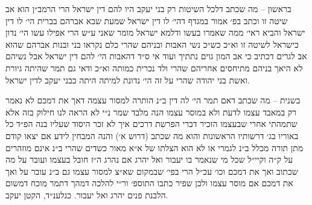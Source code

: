 \documentclass[12pt, openany]{book}
\begin{document}
\begin{multicols}{2}
בראשון – מה שכתב דלכל השיטות רק בני יעקב היו להם דין ישראל הרי הרמב״ן הוא אב שיטה זו וכתב בפ׳ אמור במגדף דהי׳ לו דין ישראל שמעת שבא אברהם בברית הי׳ לו דין ישראל והביא ראי׳ ממה שאמרו בעשו ודלמא ישראל מומר שאני ע״ש הרי אפילו עשו הי׳ נדון כישראל לשיטה זו וא״כ כש״כ נשי האבות ובניהם שהרי כלם נקראו בני ובנות אברהם שהוא אב לגרים דכתיב כי אב המון גוים נתתיך ועוד אי ס״ד דהאבות הי׳ להם דין ישראל אבל נשיהם לא היאך בניהם מתיחסים אחריהם שהרי ולד נכרית כמותה וא״כ ודאי גם תמר שהיתה גיורת ואשת בני יהודה שהרי על זה הי׳ נדונת למיתה היתה כבני יעקב לדין ישראל.\\\vspace{0pt}

בשנית – מה שכתב דאם תמר הי׳ לה דין ב״נ הותרה למסור עצמה דאך את דמכם לא נאמר רק במאבד עצמו לדעת ולא במוסר עצמו הנה מלבד שמר נ״י לא הראה לנו חילוק בזה אלא שתמהתי אחרי שבעצמו הזכיר דברי הפרשת דרכים איך לא זכר היסוד שעליו בנה הפ״ד כל באוריו בג׳ דרשותיו הראשונות והוא מה שכתב (דרוש א׳) והנה המבחין לידע אם יצאו קודם מתן תורה מכלל ב״נ לגמרי או לא הוא הצלתו של א״א מאור כשדים שהרי ב״נ אינם מוזהרים על ק״ה וקיי״ל שכל מי שנאמר בו יעבור ואל יהרג אם נהרג ה״ז חובל בעצמו ועובר על מה שכתוב ואך את דמכם וכו׳ עכ״ל הרי בפי׳ שבמקום שא״צ למסור עצמו גם ב״נ עובר על ואך את דמכם אם מוסר עצמו ולכן שפיר כתבו התוספ׳ ור״י להלכה דמהך דתמר מוכח דמשום הלבנת פנים יהרג ואל יעבור. כנלענ״ד, הקטן יעקב.\\\vspace{0pt}

\end{multicols}\newpage
\end{document}

